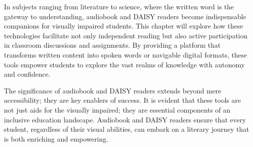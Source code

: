 \documentclass[14pt,letterpaper,twoside]{extreport}
\begin{document}
In subjects ranging from literature to science, where the written word is the gateway to understanding, audiobook and DAISY readers become indispensable companions for visually impaired students. This chapter will explore how these technologies facilitate not only independent reading but also active participation in classroom discussions and assignments. By providing a platform that transforms written content into spoken words or navigable digital formats, these tools empower students to explore the vast realms of knowledge with autonomy and confidence.

The significance of audiobook and DAISY readers extends beyond mere accessibility; they are key enablers of success. It is evident that these tools are not just aids for the visually impaired; they are essential components of an inclusive education landscape. Audiobook and DAISY readers ensure that every student, regardless of their visual abilities, can embark on a literary journey that is both enriching and empowering.
\end{document}
